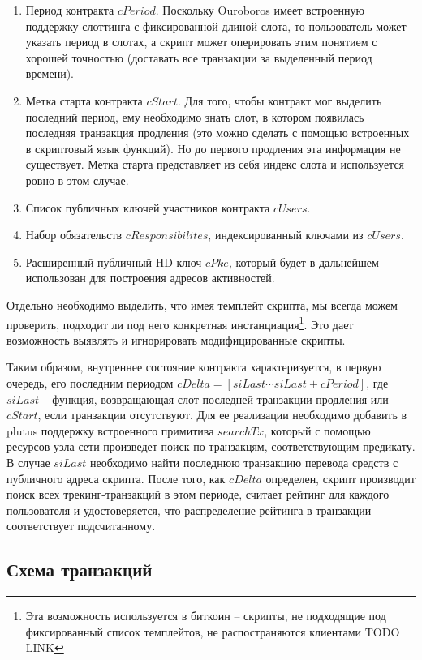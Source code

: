 \documentclass[specification,annotation]{itmo-student-thesis}
\begin{document}
\begin{enumerate}
\item Период контракта $cPeriod$. Поскольку Ouroboros имеет встроенную
  поддержку слоттинга с фиксированной длиной слота, то пользователь
  может указать период в слотах, а скрипт может оперировать этим
  понятием с хорошей точностью (доставать все транзакции за выделенный
  период времени).
\item Метка старта контракта $cStart$. Для того, чтобы контракт мог
  выделить последний период, ему необходимо знать слот, в котором
  появилась последняя транзакция продления (это можно сделать с
  помощью встроенных в скриптовый язык функций). Но до первого
  продления эта информация не существует. Метка старта представляет из
  себя индекс слота и используется ровно в этом случае.
\item Список публичных ключей участников контракта $cUsers$.
\item Набор обязательств $cResponsibilites$, индексированный ключами
  из $cUsers$.
\item Расширенный публичный HD ключ $cPke$, который будет в дальнейшем
  использован для построения адресов активностей.
\end{enumerate}

Отдельно необходимо выделить, что имея темплейт скрипта, мы всегда
можем проверить, подходит ли под него конкретная
инстанциация\footnote{Эта возможность используется в биткоин --
скрипты, не подходящие под фиксированный список темплейтов, не
распостраняются клиентами TODO LINK}. Это дает возможность выявлять и
игнорировать модифицированные скрипты.

Таким образом, внутреннее состояние контракта характеризуется, в
первую очередь, его последним периодом $cDelta = [siLast \cdots
siLast+cPeriod]$, где $siLast$ -- функция, возвращающая слот
последней транзакции продления или $cStart$, если транзакции
отсутствуют. Для ее реализации необходимо добавить в plutus поддержку
встроенного примитива $searchTx$, который с помощью ресурсов узла сети
произведет поиск по транзакцям, соответствующим предикату. В случае
$siLast$ необходимо найти последнюю транзакцию перевода средств с
публичного адреса скрипта. После того, как $cDelta$ определен, скрипт
производит поиск всех трекинг-транзакций в этом периоде, считает
рейтинг для каждого пользователя и удостоверяется, что распределение
рейтинга в транзакции соответствует подсчитанному.

\subsection{Схема транзакций}
\end{document}
